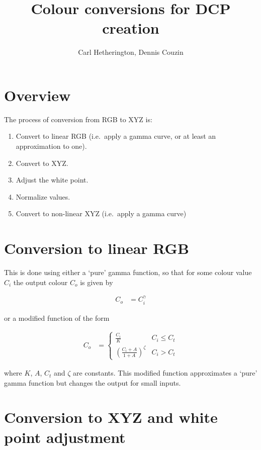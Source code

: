\documentclass{article}
\title{Colour conversions for DCP creation}
\author{Carl Hetherington, Dennis Couzin}
\date{}
\begin{document}
\maketitle

\section{Overview}

The process of conversion from RGB to XYZ is:

\begin{enumerate}
\item Convert to linear RGB (i.e.\ apply a gamma curve, or at least an approximation to one).
\item Convert to XYZ.
\item Adjust the white point.
\item Normalize values.
\item Convert to non-linear XYZ (i.e.\ apply a gamma curve)
\end{enumerate}


\section{Conversion to linear RGB}

This is done using either a `pure' gamma function, so that for some colour value $C_i$ the output colour $C_o$ is given by

\begin{align*}
C_o &= C_i ^ \gamma
\end{align*}

or a modified function of the form

\begin{align*}
C_o &= \left\{
\begin{array}{ll}
\frac{C_i}{K} & C_i \leq C_t \\
\left( \frac{C_i + A}{1 + A} \right)^\zeta & C_i > C_t
\end{array}
\right.
\end{align*}

where $K$, $A$, $C_t$ and $\zeta$ are constants.  This modified function approximates a `pure' gamma function but changes the output for small inputs.


\section{Conversion to XYZ and white point adjustment}
\end{document}
